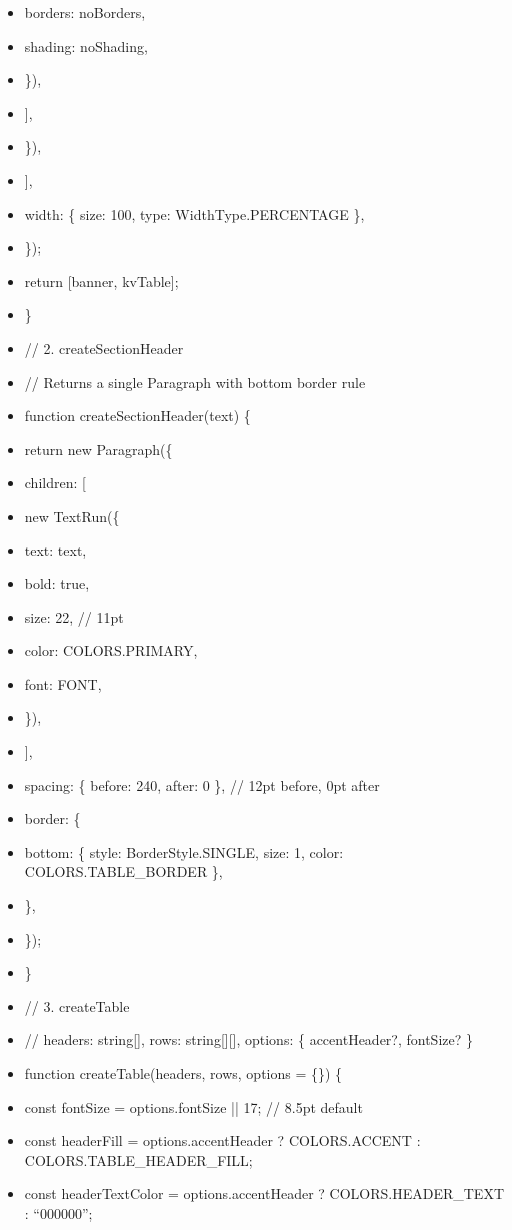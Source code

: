 \documentclass[11pt]{article}
\begin{document}
\begin{itemize}[leftmargin=*,itemsep=2pt,topsep=2pt]
\item {} borders: noBorders,
\item {} shading: noShading,
\item {} \}),
\item {} ],
\item {} \}),
\item {} ],
\item {} width: \{ size: 100, type: WidthType.PERCENTAGE \},
\item {} \});
\item {} return [banner, kvTable];
\item {} \}
\item {} // 2. createSectionHeader
\item {} // Returns a single Paragraph with bottom border rule
\item {} function createSectionHeader(text) \{
\item {} return new Paragraph(\{
\item {} children: [
\item {} new TextRun(\{
\item {} text: text,
\item {} bold: true,
\item {} size: 22, // 11pt
\item {} color: COLORS.PRIMARY,
\item {} font: FONT,
\item {} \}),
\item {} ],
\item {} spacing: \{ before: 240, after: 0 \}, // 12pt before, 0pt after
\item {} border: \{
\item {} bottom: \{ style: BorderStyle.SINGLE, size: 1, color: COLORS.TABLE\_\allowbreak{}BORDER \},
\item {} \},
\item {} \});
\item {} \}
\item {} // 3. createTable
\item {} // headers: string[], rows: string[][], options: \{ accentHeader?, fontSize? \}
\item {} function createTable(headers, rows, options = \{\}) \{
\item {} const fontSize = options.fontSize || 17; // 8.5pt default
\item {} const headerFill = options.accentHeader ? COLORS.ACCENT : COLORS.TABLE\_\allowbreak{}HEADER\_\allowbreak{}FILL;
\item {} const headerTextColor = options.accentHeader ? COLORS.HEADER\_\allowbreak{}TEXT : ``000000'';

\end{itemize}
\end{document}
